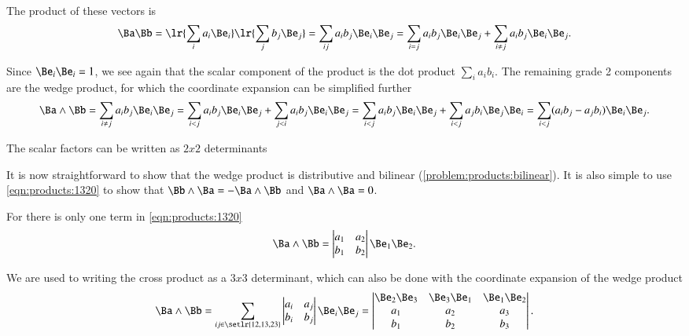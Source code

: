 The product of these vectors is
\begin{dmath}\label{eqn:products:1360}
\Ba \Bb
=
\lr{ \sum_i a_i \Be_i } \lr{ \sum_j b_j \Be_j }
=
\sum_{ij} a_i b_j \Be_i \Be_j
=
\sum_{i = j} a_i b_j \Be_i \Be_j
+
\sum_{i \ne j} a_i b_j \Be_i \Be_j.
\end{dmath}

Since \( \Be_i \Be_i = 1 \), we see again that the scalar component of the product is the dot product \( \sum_i a_i b_i \).
The remaining grade 2 components are the wedge product, for which the coordinate expansion can be simplified further
\begin{dmath}\label{eqn:products:1460}
\Ba \wedge \Bb
=
\sum_{i \ne j} a_i b_j \Be_i \Be_j
=
\sum_{i < j} a_i b_j \Be_i \Be_j
+
\sum_{j < i} a_i b_j \Be_i \Be_j
=
\sum_{i < j} a_i b_j \Be_i \Be_j
+
\sum_{i < j} a_j b_i \Be_j \Be_i
=
\sum_{i < j} (a_i b_j - a_j b_i) \Be_i \Be_j.
\end{dmath}

The scalar factors can be written as \( 2 x 2 \) determinants

It is now straightforward to show that the wedge product is distributive and bilinear (\cref{problem:products:bilinear}).
It is also simple to use \cref{eqn:products:1320} to show that \( \Bb \wedge \Ba = -\Ba \wedge \Bb \) and \( \Ba \wedge \Ba = 0 \).

For  there is only one term in \cref{eqn:products:1320}
\begin{dmath}\label{eqn:products:1720}
\Ba \wedge \Bb
=
\begin{vmatrix}
a_1 & a_2 \\
b_1 & b_2
\end{vmatrix}
\Be_1 \Be_2.
\end{dmath}

We are used to writing the cross product as a \( 3 x 3 \) determinant, which can also be done with the coordinate expansion of the
 wedge product
\begin{equation}\label{eqn:products:1740}
\Ba \wedge \Bb
=
\sum_{ ij \in \setlr{ 12, 13, 23 } }
\begin{vmatrix}
a_i & a_j \\
b_i & b_j
\end{vmatrix}
\Be_i \Be_j
=
\begin{vmatrix}
\Be_2 \Be_3 & \Be_3 \Be_1 & \Be_1 \Be_2 \\
a_1 & a_2 & a_3 \\
b_1 & b_2 & b_3 \\
\end{vmatrix}.
\end{equation}

